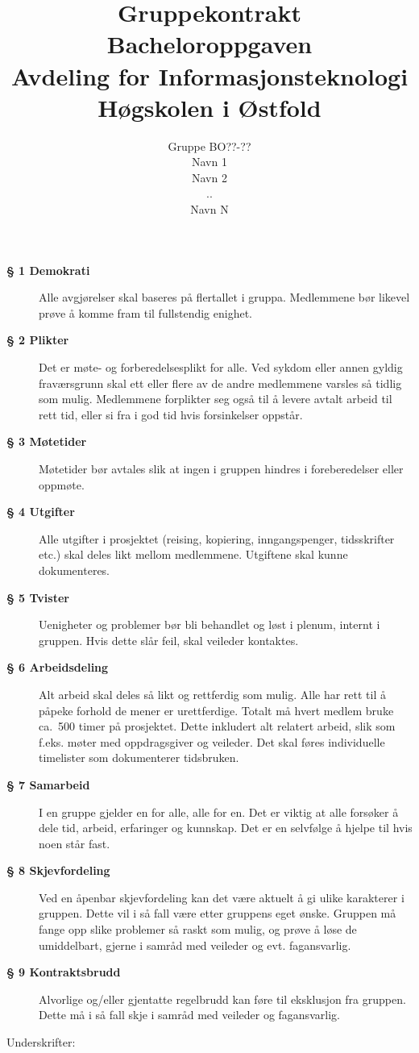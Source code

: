 \documentclass[12pt,a4paper]{report}
\begin{document}
\pagestyle{empty}

\title{
{\Huge  \vspace{-2cm} Gruppekontrakt}\\
\vspace{2cm}
Bacheloroppgaven\\
Avdeling for Informasjonsteknologi\\
Høgskolen i Østfold
}

\author{
Gruppe BO??-?? \\
Navn 1\\
Navn 2\\
..\\
Navn N}
\maketitle

\begin{description}
  \item[\bfseries § 1 Demokrati] 
  Alle avgjørelser skal baseres på flertallet i gruppa. Medlemmene bør likevel prøve å komme fram til fullstendig enighet.
  \item[\bfseries § 2 Plikter] Det er møte- og forberedelsesplikt for alle. Ved sykdom eller annen gyldig fraværsgrunn skal ett eller flere av de andre medlemmene varsles så tidlig som mulig. Medlemmene forplikter seg også til å levere avtalt arbeid til rett tid, eller si fra i god tid hvis forsinkelser oppstår.
  \item[\bfseries § 3 Møtetider] Møtetider bør avtales slik at ingen i gruppen hindres i foreberedelser eller oppmøte.
  \item[\bfseries § 4 Utgifter] Alle utgifter i prosjektet (reising, kopiering, inngangspenger, tidsskrifter etc.) skal deles likt mellom medlemmene. Utgiftene skal kunne dokumenteres.
  \item[\bfseries § 5 Tvister] Uenigheter og problemer bør bli behandlet og løst i plenum, internt i gruppen. Hvis dette slår feil, skal veileder kontaktes.
  \item[\bfseries § 6 Arbeidsdeling] Alt arbeid skal deles så likt og rettferdig som mulig. Alle har rett til å påpeke forhold de mener er urettferdige. Totalt må hvert medlem bruke  ca.\ 500 timer på prosjektet. Dette inkludert alt relatert arbeid, slik som f.eks. møter med oppdragsgiver og veileder. Det skal føres individuelle timelister som dokumenterer tidsbruken.
  \item[\bfseries § 7 Samarbeid] I en gruppe gjelder en for alle, alle for en. Det er viktig at alle forsøker å dele tid, arbeid, erfaringer og kunnskap. Det er en selvfølge å hjelpe til hvis noen står fast.
   \item[\bfseries § 8 Skjevfordeling] Ved en åpenbar skjevfordeling kan det være aktuelt å gi ulike karakterer i gruppen. Dette vil i så fall være etter gruppens eget ønske. Gruppen må fange opp slike problemer så raskt som mulig, og prøve å løse de umiddelbart, gjerne i samråd med veileder og evt. fagansvarlig.
    \item[\bfseries § 9 Kontraktsbrudd] Alvorlige og/eller gjentatte regelbrudd kan føre til eksklusjon fra gruppen. Dette må i så fall skje i samråd med veileder og fagansvarlig.
\end{description}

\vspace{1cm}
\begin{center}
Underskrifter:
\end{center}
\end{document}
